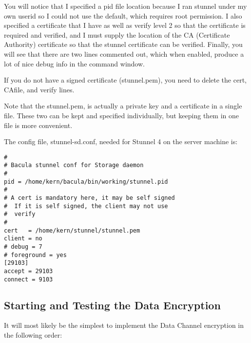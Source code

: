 You will notice that I specified a pid file location because I ran stunnel
under my own userid so I could not use the default, which requires root
permission. I also specified a certificate that I have as well as verify level
2 so that the certificate is required and verified, and I must supply the
location of the CA (Certificate Authority) certificate so that the stunnel
certificate can be verified. Finally, you will see that there are two lines
commented out, which when enabled, produce a lot of nice debug info in the
command window. 

If you do not have a signed certificate (stunnel.pem), you need to delete the
cert, CAfile, and verify lines. 

Note that the stunnel.pem, is actually a private key and a certificate in a
single file. These two can be kept and specified individually, but keeping
them in one file is more convenient. 

The config file, stunnel-sd.conf, needed for Stunnel 4 on the server machine
is: 

\footnotesize
\begin{verbatim}
#
# Bacula stunnel conf for Storage daemon
#
pid = /home/kern/bacula/bin/working/stunnel.pid
#
# A cert is mandatory here, it may be self signed
#  If it is self signed, the client may not use
#  verify
#
cert   = /home/kern/stunnel/stunnel.pem
client = no
# debug = 7
# foreground = yes
[29103]
accept = 29103
connect = 9103
\end{verbatim}
\normalsize

\subsection*{Starting and Testing the Data Encryption}

It will most likely be the simplest to implement the Data Channel encryption
in the following order: 

